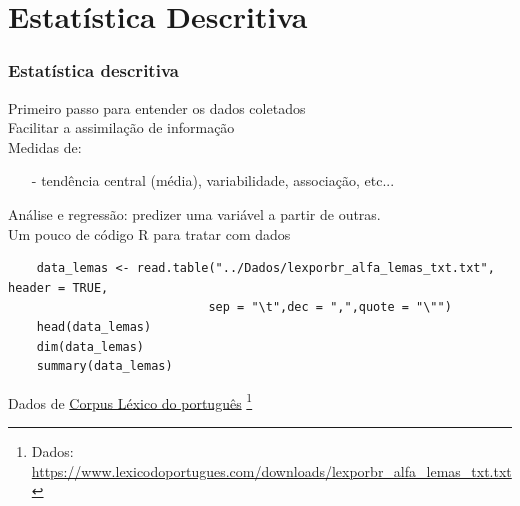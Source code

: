 \documentclass[graphics,14pt]{beamer}
\newcommand{\lfr}[1]{\let\thefootnote\relax\footnote{\hspace{0.6cm}\vspace{1.25cm} #1}}
\begin{document}
\section{Estatística Descritiva}
\begin{frame}[t,fragile=singleslide]
\frametitle{Estatística descritiva}
	Primeiro passo para entender os dados coletados\\
	Facilitar a assimilação de informação\\
	Medidas de:
	\begin{itemize}
		\item[-] tendência central (média), variabilidade, associação, etc...
	\end{itemize}
	Análise e regressão: predizer uma variável a partir de outras.\\
	\vspace{1.0cm}
	Um pouco de código R para tratar com dados
	\begin{lstlisting}
	data_lemas <- read.table("../Dados/lexporbr_alfa_lemas_txt.txt", header = TRUE, 
							sep = "\t",dec = ",",quote = "\"")
	head(data_lemas)
	dim(data_lemas)
	summary(data_lemas)
	\end{lstlisting}
	\vspace{1.0cm}	
	Dados de \href{https://www.lexicodoportugues.com/}{Corpus Léxico do português}
	\vfill
	\lfr{Dados: \url{https://www.lexicodoportugues.com/downloads/lexporbr_alfa_lemas_txt.txt}}
\end{frame}
\end{document}
